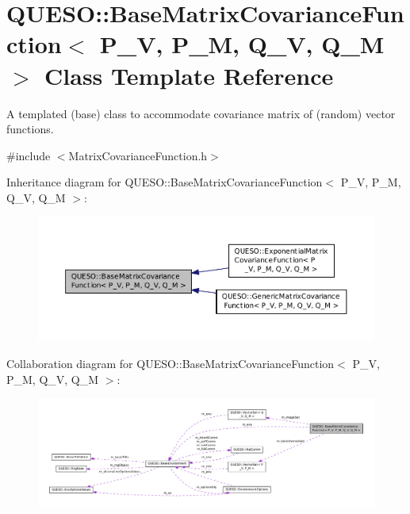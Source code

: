 \hypertarget{class_q_u_e_s_o_1_1_base_matrix_covariance_function}{\section{Q\-U\-E\-S\-O\-:\-:Base\-Matrix\-Covariance\-Function$<$ P\-\_\-\-V, P\-\_\-\-M, Q\-\_\-\-V, Q\-\_\-\-M $>$ Class Template Reference}
\label{class_q_u_e_s_o_1_1_base_matrix_covariance_function}
}


A templated (base) class to accommodate covariance matrix of (random) vector functions.  




{\ttfamily \#include $<$Matrix\-Covariance\-Function.\-h$>$}



Inheritance diagram for Q\-U\-E\-S\-O\-:\-:Base\-Matrix\-Covariance\-Function$<$ P\-\_\-\-V, P\-\_\-\-M, Q\-\_\-\-V, Q\-\_\-\-M $>$\-:
\nopagebreak
\begin{figure}[H]
\begin{center}
\leavevmode
\includegraphics[width=350pt]{class_q_u_e_s_o_1_1_base_matrix_covariance_function__inherit__graph}
\end{center}
\end{figure}


Collaboration diagram for Q\-U\-E\-S\-O\-:\-:Base\-Matrix\-Covariance\-Function$<$ P\-\_\-\-V, P\-\_\-\-M, Q\-\_\-\-V, Q\-\_\-\-M $>$\-:
\nopagebreak
\begin{figure}[H]
\begin{center}
\leavevmode
\includegraphics[width=350pt]{class_q_u_e_s_o_1_1_base_matrix_covariance_function__coll__graph}
\end{center}
\end{figure}
